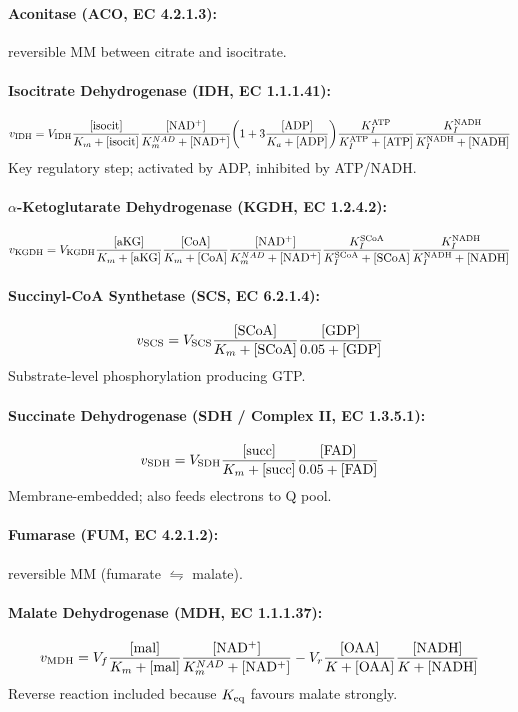 \documentclass[11pt,a4paper]{article}
\newcommand{\eq}[1]{\begin{equation}#1\end{equation}}
\begin{document}
\paragraph{Aconitase (ACO, EC 4.2.1.3):} reversible MM between citrate and isocitrate.

\paragraph{Isocitrate Dehydrogenase (IDH, EC 1.1.1.41):}
\eq{ v_{\rm IDH} = V_{\rm IDH}\frac{[\rm isocit]}{K_m+[\rm isocit]}\frac{[\rm NAD^+]}{K_m^{NAD}+[\rm NAD^+]}\bigg(1+3\frac{[\rm ADP]}{K_a+[\rm ADP]}\bigg)\frac{K_I^{\rm ATP}}{K_I^{\rm ATP}+[\rm ATP]}\frac{K_I^{\rm NADH}}{K_I^{\rm NADH}+[\rm NADH]} }
Key regulatory step; activated by ADP, inhibited by ATP/NADH.

\paragraph{$\alpha$-Ketoglutarate Dehydrogenase (KGDH, EC 1.2.4.2):}
\eq{ v_{\rm KGDH} = V_{\rm KGDH}\frac{[\rm aKG]}{K_m+[\rm aKG]}\frac{[\rm CoA]}{K_m+[\rm CoA]}\frac{[\rm NAD^+]}{K_m^{NAD}+[\rm NAD^+]}\frac{K_I^{\rm SCoA}}{K_I^{\rm SCoA}+[\rm SCoA]}\frac{K_I^{\rm NADH}}{K_I^{\rm NADH}+[\rm NADH]} }

\paragraph{Succinyl-CoA Synthetase (SCS, EC 6.2.1.4):}
\eq{ v_{\rm SCS} = V_{\rm SCS}\frac{[\rm SCoA]}{K_m+[\rm SCoA]}\frac{[\rm GDP]}{0.05+[\rm GDP]} }
Substrate-level phosphorylation producing GTP.

\paragraph{Succinate Dehydrogenase (SDH / Complex II, EC 1.3.5.1):}
\eq{ v_{\rm SDH} = V_{\rm SDH}\frac{[\rm succ]}{K_m+[\rm succ]}\frac{[\rm FAD]}{0.05+[\rm FAD]} }
Membrane-embedded; also feeds electrons to Q pool.

\paragraph{Fumarase (FUM, EC 4.2.1.2):} reversible MM (fumarate $\leftrightharpoons$ malate).

\paragraph{Malate Dehydrogenase (MDH, EC 1.1.1.37):}
\eq{ v_{\rm MDH} = V_f\frac{[\rm mal]}{K_m+[\rm mal]}\frac{[\rm NAD^+]}{K_m^{NAD}+[\rm NAD^+]} - V_r\frac{[\rm OAA]}{K+[\rm OAA]}\frac{[\rm NADH]}{K+[\rm NADH]} }
Reverse reaction included because $K_{\rm eq}$ favours malate strongly.
\end{document}
